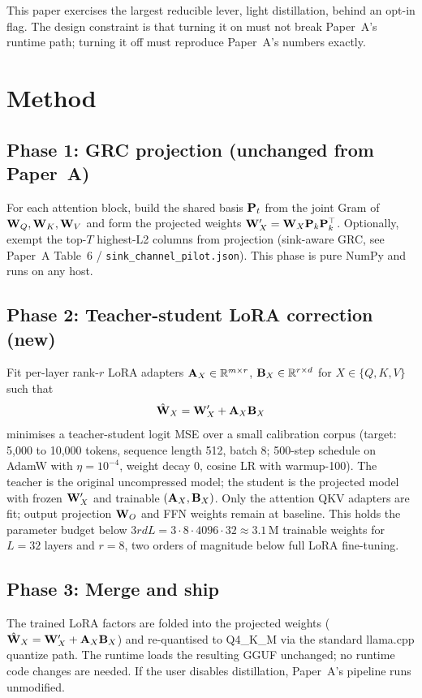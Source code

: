 \documentclass[11pt]{article}
\begin{document}
This paper exercises the largest reducible lever, light distillation,
behind an opt-in flag. The design constraint is that turning it on
must not break Paper~A's runtime path; turning it off must reproduce
Paper~A's numbers exactly.

\section{Method}
\label{sec:method}

\subsection{Phase 1: GRC projection (unchanged from Paper~A)}
For each attention block, build the shared basis $\mathbf{P}_t$ from the
joint Gram of $\mathbf{W}_Q, \mathbf{W}_K, \mathbf{W}_V$ and form the projected
weights $\mathbf{W}_X^\prime = \mathbf{W}_X \mathbf{P}_k \mathbf{P}_k^\top$. Optionally,
exempt the top-$T$ highest-L2 columns from projection (sink-aware GRC,
see Paper~A Table~6 / \texttt{sink\_channel\_pilot.json}). This phase
is pure NumPy and runs on any host.

\subsection{Phase 2: Teacher-student LoRA correction (new)}
Fit per-layer rank-$r$ LoRA adapters
$\mathbf{A}_X \in \mathbb{R}^{m \times r}$, $\mathbf{B}_X \in \mathbb{R}^{r \times d}$
for $X \in \{Q, K, V\}$ such that
$$
\hat{\mathbf{W}}_X = \mathbf{W}_X^\prime + \mathbf{A}_X \mathbf{B}_X
$$
minimises a teacher-student logit MSE over a small calibration corpus
(target: 5{,}000 to 10{,}000 tokens, sequence length 512, batch 8;
500-step schedule on AdamW with $\eta{=}10^{-4}$, weight decay $0$,
cosine LR with warmup-100). The teacher is the original uncompressed
model; the student is the projected model with frozen
$\mathbf{W}_X^\prime$ and trainable $(\mathbf{A}_X, \mathbf{B}_X)$. Only the
attention QKV adapters are fit; output projection $\mathbf{W}_O$ and FFN
weights remain at baseline. This holds the parameter budget below
$3rdL = 3 \cdot 8 \cdot 4096 \cdot 32 \approx 3.1\,\text{M}$ trainable
weights for $L{=}32$ layers and $r{=}8$, two orders of magnitude below
full LoRA fine-tuning.

\subsection{Phase 3: Merge and ship}
The trained LoRA factors are folded into the projected weights
($\hat{\mathbf{W}}_X = \mathbf{W}_X^\prime + \mathbf{A}_X \mathbf{B}_X$) and re-quantised
to Q4\_K\_M via the standard llama.cpp quantize path. The runtime
loads the resulting GGUF unchanged; no runtime code changes are
needed. If the user disables distillation, Paper~A's pipeline runs
unmodified.
\end{document}
